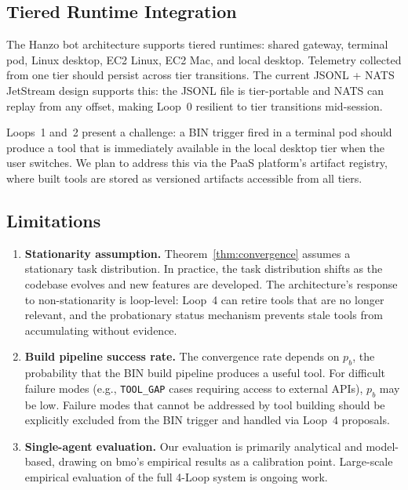 \documentclass[11pt]{article}
\begin{document}
\subsection{Tiered Runtime Integration}

The Hanzo bot architecture supports tiered runtimes: shared gateway, terminal
pod, Linux desktop, EC2 Linux, EC2 Mac, and local desktop. Telemetry collected
from one tier should persist across tier transitions. The current JSONL +
NATS JetStream design supports this: the JSONL file is tier-portable and
NATS can replay from any offset, making Loop~0 resilient to tier transitions
mid-session.

Loops~1 and~2 present a challenge: a BIN trigger fired in a terminal pod
should produce a tool that is immediately available in the local desktop tier
when the user switches. We plan to address this via the PaaS platform's
artifact registry, where built tools are stored as versioned artifacts
accessible from all tiers.

\subsection{Limitations}

\begin{enumerate}[leftmargin=1.5em]
    \item \textbf{Stationarity assumption.} Theorem~\ref{thm:convergence}
          assumes a stationary task distribution. In practice, the task
          distribution shifts as the codebase evolves and new features are
          developed. The architecture's response to non-stationarity is
          loop-level: Loop~4 can retire tools that are no longer relevant,
          and the probationary status mechanism prevents stale tools from
          accumulating without evidence.

    \item \textbf{Build pipeline success rate.} The convergence rate depends
          on $p_b$, the probability that the BIN build pipeline produces a
          useful tool. For difficult failure modes (e.g., \texttt{TOOL\_GAP}
          cases requiring access to external APIs), $p_b$ may be low.
          Failure modes that cannot be addressed by tool building should
          be explicitly excluded from the BIN trigger and handled via
          Loop~4 proposals.

    \item \textbf{Single-agent evaluation.} Our evaluation is primarily
          analytical and model-based, drawing on bmo's empirical results
          as a calibration point. Large-scale empirical evaluation of the
          full 4-Loop system is ongoing work.
\end{enumerate}
\end{document}
